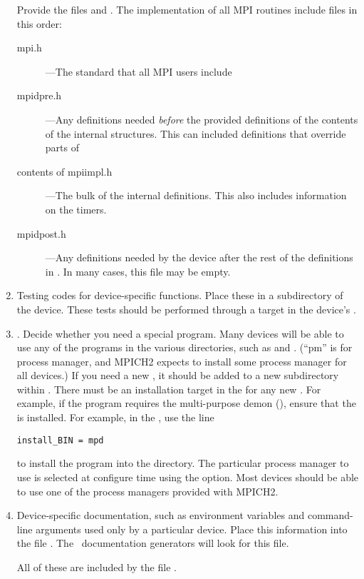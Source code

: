 \begin{enumerate}
Provide the files
 and .  The implementation of all MPI
routines include files in this order:

\begin{description}
\item[mpi.h]---The standard  that all MPI users include
\item[mpidpre.h]---Any definitions needed \emph{before} the provided
definitions of the contents of the internal structures.  This can
included definitions that override parts of 
\item[contents of mpiimpl.h]---The bulk of the internal definitions.
This also includes information on the timers.
\item[mpidpost.h]---Any definitions needed by the device after the rest
of the definitions in .  In many cases, this file may
be empty.
\end{description}

\item Testing codes for device-specific functions.  Place these
in a  subdirectory of the device. These tests 
should be performed through a  target in the device's
. 


\item {}.  Decide whether you need a special
   program.  Many devices will be able to use any of the
 programs in the various  directories, such
as  and .  (``pm'' is for process
manager, and MPICH2 expects to install some process manager for all
devices.)
If you need a new
, it should be added to a new subdirectory within
.  There must be an installation target in the
 for any new .  For example, if the
 program requires the multi-purpose demon
  (), ensure that the  is installed.  For example,
  in the , use the line
\begin{verbatim}
install_BIN = mpd
\end{verbatim}
to install the program  into the  directory.  The
particular process manager to use is selected at configure time using
the  option.  Most devices should be able to use one
of the process managers provided with MPICH2.

\item Device-specific documentation, such as environment variables and
  command-line arguments used only by a particular device.  Place this
  information into the file .
  The \mpich\ 
  documentation generators will look for this file.


All of these are included by the file .
\end{enumerate}

